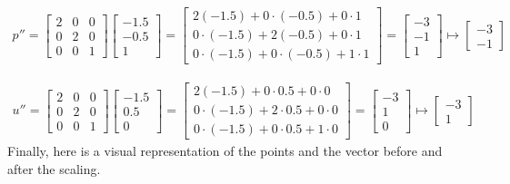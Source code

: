 \documentclass{article}
\begin{document}
\begin{align*}
	p'' = \begin{bmatrix}2&0&0\\ 0&2&0\\ 0&0&1\end{bmatrix}\begin{bmatrix}-1.5\\ -0.5\\ 1\end{bmatrix} = \begin{bmatrix}2\left(-1.5\right)+0\cdot \left(-0.5\right)+0\cdot 1\\ 0\cdot \left(-1.5\right)+2\left(-0.5\right)+0\cdot 1\\ 0\cdot \left(-1.5\right)+0\cdot \left(-0.5\right)+1\cdot 1\end{bmatrix} = \begin{bmatrix}-3\\ -1\\ 1\end{bmatrix} \mapsto \begin{bmatrix}-3\\ -1\end{bmatrix}
\end{align*}

\begin{align*}
	u'' = \begin{bmatrix}2&0&0\\ 0&2&0\\ 0&0&1\end{bmatrix}\begin{bmatrix}-1.5\\ 0.5\\ 0\end{bmatrix} = \begin{bmatrix}2\left(-1.5\right)+0\cdot 0.5+0\cdot 0\\ 0\cdot \left(-1.5\right)+2\cdot 0.5+0\cdot 0\\ 0\cdot \left(-1.5\right)+0\cdot 0.5+1\cdot 0\end{bmatrix} = \begin{bmatrix}-3\\ 1\\ 0\end{bmatrix} \mapsto \begin{bmatrix}-3\\ 1\end{bmatrix}
\end{align*}
Finally, here is a visual representation of the points and the vector before and after the scaling. \\
\end{document}
